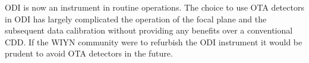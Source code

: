 \documentclass[draft]{spieman}
\begin{document}
ODI is now an instrument in routine operations. The choice to use  OTA detectors in ODI has largely 
complicated the operation of the focal plane and the subsequent data calibration without providing any 
benefits over a conventional CDD. If the WIYN community were to refurbish the ODI instrument it would 
be prudent to avoid OTA detectors in the future. 
 
 

\end{document}

